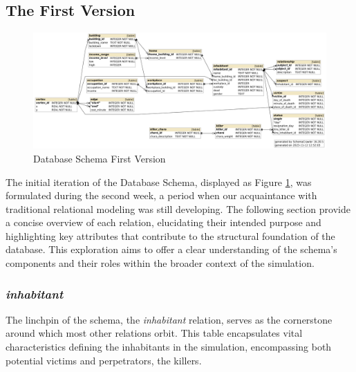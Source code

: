 \documentclass{article}
\begin{document}
\subsection{The First Version}
\begin{figure}[H]
  \centering
  \includegraphics[width=1\textwidth]{database_version1.jpg}
  \caption{Database Schema First Version}
  \label{fig: Schema v1}
\end{figure}

The initial iteration of the Database Schema, displayed as Figure \ref{fig: Schema v1}, was formulated during the second week, a period when our acquaintance with traditional relational modeling was still developing. The following section provide a concise overview of each relation, elucidating their intended purpose and highlighting key attributes that contribute to the structural foundation of the database. This exploration aims to offer a clear understanding of the schema's components and their roles within the broader context of the simulation.

\subsubsection{\textit{inhabitant}}
The linchpin of the schema, the \textit{inhabitant} relation, serves as the cornerstone around which most other relations orbit. This table encapsulates vital characteristics defining the inhabitants in the simulation, encompassing both potential victims and perpetrators, the killers.
\end{document}
